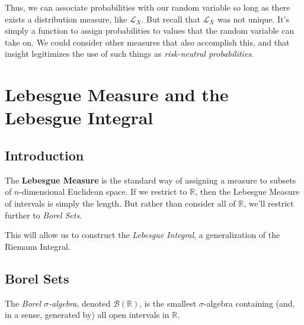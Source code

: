 \documentclass[a4paper,12pt]{scrartcl}
\begin{document}
Thus, we can associate probabilities with our random variable so long as there exists a distribution measure, like $\mathcal{L}_X$. 
But recall that $\mathcal{L}_X$ was not unique.  It's simply a function to assign probabilities to values that the random variable can
take on.  We could consider other measures that also accomplish this, and that insight legitimizes the use of such things as 
\emph{risk-neutral probabilities}.

\section{Lebesgue Measure and the Lebesgue Integral}

\subsection{Introduction}

The \textbf{Lebesgue Measure} is the standard way of assigning a measure to subsets of $n$-dimensional Euclidean space.  If we restrict
to $\mathbb{R}$, then the Lebesgue Measure of intervals is simply the length. But rather than consider all of $\mathbb{R}$, we'll 
restrict further to \emph{Borel Sets}.

This will allow us to construct the \emph{Lebesgue Integral}, a generalization of the Riemann Integral.

\subsection{Borel Sets}

The \emph{Borel $\sigma$-algebra}, denoted $\mathcal{B}(\mathbb{R})$, is the smallest $\sigma$-algebra containing (and, in a sense, 
generated by) all open intervals
in $\mathbb{R}$. 
\end{document}
